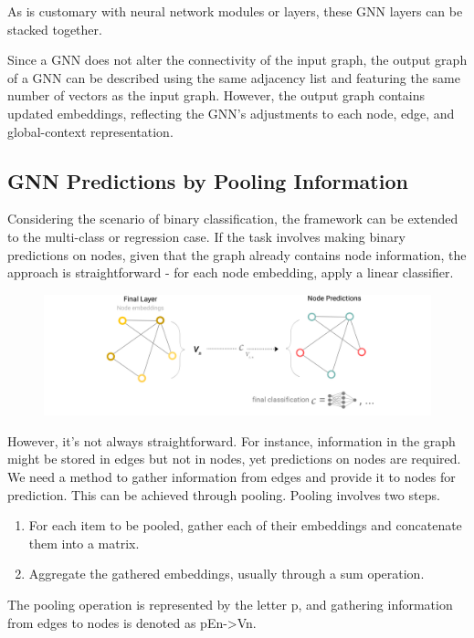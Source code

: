 As is customary with neural network modules or layers, these GNN layers can be stacked together.

Since a GNN does not alter the connectivity of the input graph, the output graph of a GNN can be described using the same adjacency list and featuring the same number of vectors as the input graph. However, the output graph contains updated embeddings, reflecting the GNN's adjustments to each node, edge, and global-context representation.



\subsection{GNN Predictions by Pooling Information}
\hspace{\parindent}
Considering the scenario of binary classification, the framework can be extended to the multi-class or regression case. If the task involves making binary predictions on nodes, given that the graph already contains node information, the approach is straightforward - for each node embedding, apply a linear classifier.

\begin{figure}[H]
  \centering
  \includegraphics[width=0.7\linewidth]{chap2/2.png}
  \label{fig:usecase}
\end{figure}

However, it's not always straightforward. For instance, information in the graph might be stored in edges but not in nodes, yet predictions on nodes are required. We need a method to gather information from edges and provide it to nodes for prediction. This can be achieved through pooling. Pooling involves two steps.

\begin{enumerate}
    \item For each item to be pooled, gather each of their embeddings and concatenate them into a matrix.
    \item Aggregate the gathered embeddings, usually through a sum operation.
\end{enumerate}

The pooling operation is represented by the letter p, and gathering information from edges to nodes is denoted as pEn->Vn.

